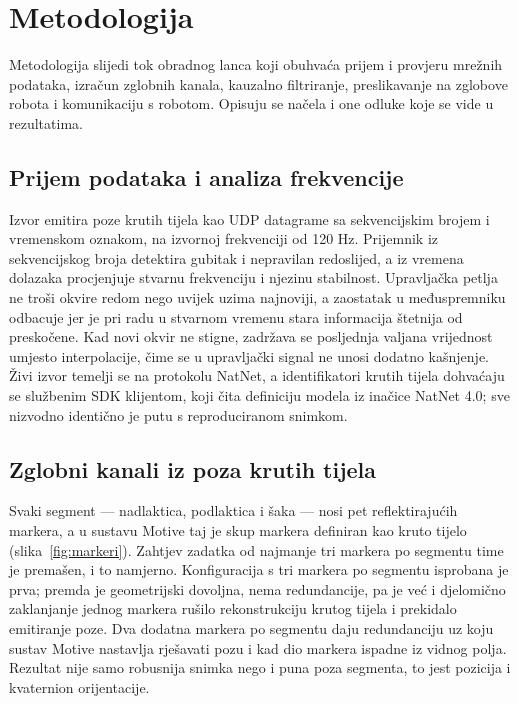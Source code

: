\section{Metodologija}
\label{sec:metodologija}

Metodologija slijedi tok obradnog lanca koji obuhvaća prijem i provjeru mrežnih podataka,
izračun zglobnih kanala, kauzalno filtriranje, preslikavanje na zglobove robota
i komunikaciju s robotom. Opisuju se načela i one odluke koje se vide u
rezultatima.

\subsection{Prijem podataka i analiza frekvencije}

Izvor emitira poze krutih tijela kao UDP datagrame sa sekvencijskim brojem i
vremenskom oznakom, na izvornoj frekvenciji od 120 Hz. Prijemnik iz
sekvencijskog broja detektira gubitak i nepravilan redoslijed, a iz vremena
dolazaka procjenjuje stvarnu frekvenciju i njezinu stabilnost. Upravljačka
petlja ne troši okvire redom nego uvijek uzima najnoviji, a zaostatak u
međuspremniku odbacuje jer je pri radu u stvarnom vremenu stara informacija
štetnija od preskočene. Kad novi okvir ne stigne, zadržava se posljednja valjana
vrijednost umjesto interpolacije, čime se u upravljački signal ne unosi dodatno
kašnjenje. Živi izvor temelji se na protokolu NatNet, a identifikatori krutih
tijela dohvaćaju se službenim SDK klijentom, koji čita definiciju modela iz
inačice NatNet 4.0; sve nizvodno identično je putu s reproduciranom snimkom.

\subsection{Zglobni kanali iz poza krutih tijela}

Svaki segment --- nadlaktica, podlaktica i šaka --- nosi pet reflektirajućih
markera, a u sustavu Motive taj je skup markera definiran kao kruto tijelo
(slika~\ref{fig:markeri}). Zahtjev zadatka od najmanje tri markera po segmentu
time je premašen, i to namjerno. Konfiguracija s tri markera po segmentu
isprobana je prva; premda je geometrijski dovoljna, nema redundancije, pa je već i
djelomično zaklanjanje jednog markera rušilo rekonstrukciju krutog tijela i
prekidalo emitiranje poze. Dva dodatna markera po segmentu daju redundanciju uz
koju sustav Motive nastavlja rješavati pozu i kad dio markera ispadne iz vidnog
polja. Rezultat nije samo robusnija snimka nego i puna poza segmenta, to jest pozicija i
kvaternion orijentacije.

